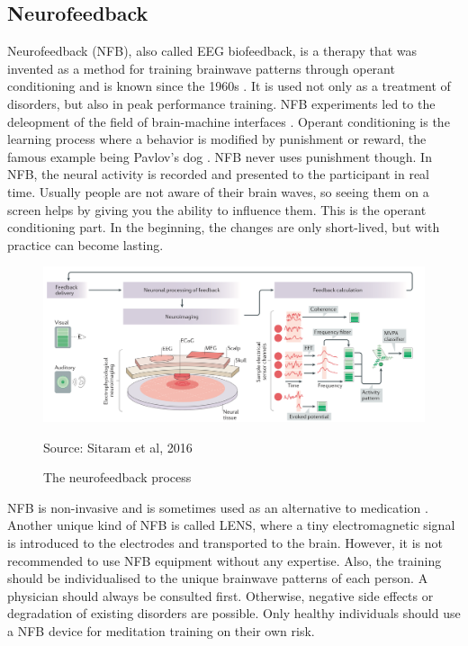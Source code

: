 \documentclass{llncs} %
\newcommand{\source}[1]{\hfill Source: {#1} }
\begin{document}
\subsection{Neurofeedback}
Neurofeedback (NFB), also called EEG biofeedback, is a therapy that was invented as a method for training brainwave patterns through operant conditioning and is known since the 1960s \cite{Hammond}. %
It is used not only as a treatment of disorders, but also in peak performance training. NFB experiments led to the deleopment of the field of brain-machine interfaces \cite{Sitaram}.
Operant conditioning is the learning process where a behavior is modified by punishment or reward, the famous example being Pavlov's dog \cite{Spence}. NFB never uses punishment though. In NFB, the neural activity is recorded and presented to the participant in real time.  
Usually people are not aware of their brain waves, so seeing them on a screen helps by giving you the ability to influence them. This is the operant conditioning part. In the beginning, the changes are only short-lived, but with practice can become lasting. 

\begin{figure}
    \includegraphics[width=\linewidth]{Neurofeedback.png}
    \caption{The neurofeedback process}  \label{neurofeedback}
    \source{Sitaram et al, 2016}
\end{figure}

NFB is non-invasive and is sometimes used as an alternative to medication \cite{Hammond}. Another unique kind of NFB is called LENS, where a tiny electromagnetic signal is introduced to the electrodes and transported to the brain.
However, it is not recommended to use NFB equipment without any expertise. Also, the training should be individualised to the unique brainwave patterns of each person. A physician should always be consulted first.
Otherwise, negative side effects or degradation of existing disorders are possible. Only healthy individuals should use a NFB device for meditation training on their own risk.
\end{document}
